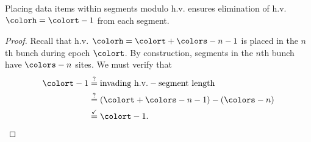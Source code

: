 \begin{lemma}
Placing data items within segments modulo h.v. ensures elimination of h.v. $\colorh = \colort - 1$ from each segment.
\end{lemma} \label{thm:steady-hv-elimination}
\begin{proof}
Recall that h.v. $\colorh = \colort + \colors - n - 1$ is placed in the $n$th bunch during epoch $\colort$.
By construction, segments in the $n$th bunch have $\colors - n$ sites.
We must verify that
\begin{align*}
\colort - 1
&\stackrel{?}{=}
\text{invading h.v.} - \text{segment length}\\
&\stackrel{?}{=}
(\colort + \colors - n - 1) - (\colors - n)
 \\
&\stackrel{\checkmark}{=} \colort - 1.
\end{align*}
\end{proof}

